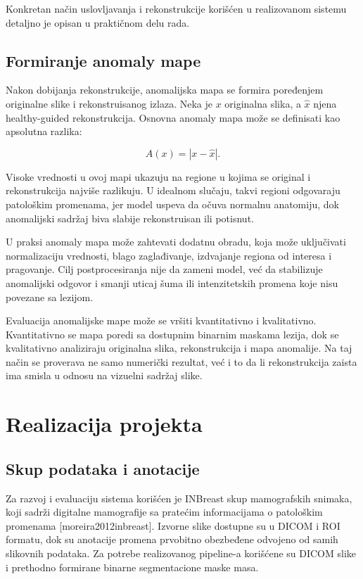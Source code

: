 \documentclass[10pt]{article}
\begin{document}
	Konkretan način uslovljavanja i rekonstrukcije korišćen u realizovanom sistemu detaljno je opisan u praktičnom delu rada.
	
	\subsection{Formiranje anomaly mape}
	
	Nakon dobijanja rekonstrukcije, anomalijska mapa se formira poređenjem originalne slike i rekonstruisanog izlaza. Neka je $x$ originalna slika, a $\hat{x}$ njena healthy-guided rekonstrukcija. Osnovna anomaly mapa može se definisati kao apsolutna razlika:
	
	\begin{equation}
		A(x) = |x - \hat{x}|.
	\end{equation}
	
	Visoke vrednosti u ovoj mapi ukazuju na regione u kojima se original i rekonstrukcija najviše razlikuju. U idealnom slučaju, takvi regioni odgovaraju patološkim promenama, jer model uspeva da očuva normalnu anatomiju, dok anomalijski sadržaj biva slabije rekonstruisan ili potisnut.
	
	U praksi anomaly mapa može zahtevati dodatnu obradu, koja može uključivati normalizaciju vrednosti, blago zaglađivanje, izdvajanje regiona od interesa i pragovanje. Cilj postprocesiranja nije da zameni model, već da stabilizuje anomalijski odgovor i smanji uticaj šuma ili intenzitetskih promena koje nisu povezane sa lezijom.
	
	Evaluacija anomalijske mape može se vršiti kvantitativno i kvalitativno. Kvantitativno se mapa poredi sa dostupnim binarnim maskama lezija, dok se kvalitativno analiziraju originalna slika, rekonstrukcija i mapa anomalije. Na taj način se proverava ne samo numerički rezultat, već i to da li rekonstrukcija zaista ima smisla u odnosu na vizuelni sadržaj slike.
	
	\section{Realizacija projekta}
	
	\subsection{Skup podataka i anotacije}
	
	Za razvoj i evaluaciju sistema korišćen je INBreast skup mamografskih snimaka, koji sadrži digitalne mamografije sa pratećim informacijama o patološkim promenama [moreira2012inbreast]. Izvorne slike dostupne su u DICOM i ROI formatu, dok su anotacije promena prvobitno obezbeđene odvojeno od samih slikovnih podataka. Za potrebe realizovanog pipeline-a korišćene su DICOM slike i prethodno formirane binarne segmentacione maske masa. 
	
\end{document}
